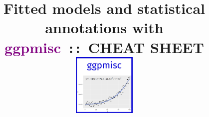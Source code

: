 \documentclass[DIV=25,a3,landscape,9pt]{scrartcl}\usepackage[]{graphicx}\usepackage[]{xcolor}
\begin{document}
\title{\huge Fitted models and statistical annotations with \textcolor{purple}{ggpmisc}\ :\,:\ CHEAT SHEET\hfill\includegraphics[width=3cm]{logo-ggpmisc.png}}
\date{\null}



\maketitle\vspace{-20mm}
\end{document}
